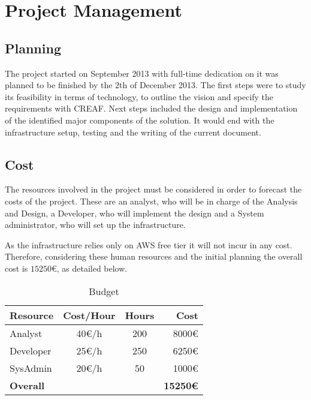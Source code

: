 \chapter{Project Management}

\section{Planning}

The project started on September 2013 with full-time dedication on it was planned to be finished by the 2th of December 2013. The first steps were to study its feasibility in terms of technology, to outline the vision and specify the requirements with CREAF. Next steps included the design and implementation of the identified major components of the solution. It would end with the infrastructure setup, testing and the writing of the current document.



\section{Cost}

The resources involved in the project must be considered in order to forecast the costs of the project. These are an analyst, who will be in charge of the Analysis and Design, a Developer, who will implement the design and a System administrator, who will set up the infrastructure.

As the infrastructure relies only on AWS free tier it will not incur in any cost. Therefore, considering these human resources and the initial planning the overall cost is $15250\euro{}$, as detailed below.

\begin{table}[H]
    \centering
    \begin{tabular}{|l|c|c|r|}
    \hline
    \textbf{Resource}  & \textbf{Cost/Hour}  & \textbf{Hours}  & \textbf{Cost} \\ \hline
    Analyst            & 40\euro{}/h         & 200             & 8000\euro{}   \\ \hline
    Developer          & 25\euro{}/h         & 250             & 6250\euro{}   \\ \hline
    SysAdmin           & 20\euro{}/h         & 50              & 1000\euro{}    \\ \hline
    \textbf{Overall}   &                     &                 & \textbf{15250\euro{}} \\ \hline
    \end{tabular}
    \caption{Budget}
    \label{tab:budget}
\end{table}

